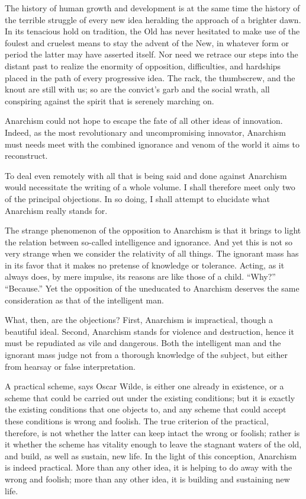 \noindent The history of human growth and development is at the same
time the history of the terrible struggle of every new idea heralding
the approach of a brighter dawn. In its tenacious hold on tradition,
the Old  has never hesitated to make use of the foulest and
cruelest means to stay the advent of the New, in whatever form or
period the latter may have asserted itself. Nor need we retrace our
steps into the distant past to realize the enormity of opposition,
difficulties, and hardships placed in the path of every progressive
idea. The rack, the thumbscrew, and the knout are still with us; so
are the convict's garb and the social wrath, all conspiring against
the spirit that is serenely marching on.

Anarchism could not hope to escape the fate of all other ideas of
innovation. Indeed, as the most revolutionary and uncompromising
innovator, Anarchism must needs meet with the combined ignorance and
venom of the world it aims to reconstruct.

To deal even remotely with all that is being said and done against
Anarchism would necessitate the writing of a whole volume. I shall
therefore meet only two of the principal objections. In so doing, I
shall attempt to elucidate what Anarchism really stands for.

The strange phenomenon of the opposition to Anarchism is that it
brings to light the relation between so-called intelligence and
ignorance. And yet this is not so very strange when we consider the
relativity of all things. The ignorant mass has in its favor that it
makes no pretense of knowledge or tolerance. Acting, as it always
does, by mere impulse, its reasons are like those of a child. ``Why?''
``Because.'' Yet the opposition of the uneducated to Anarchism
deserves the same consideration as that of the intelligent man.

What, then, are the objections? First, Anarchism is
impractical, though a beautiful ideal. Second, Anarchism stands for
violence and destruction, hence it must be repudiated as vile and
dangerous. Both the intelligent man and the ignorant mass judge not
from a thorough knowledge of the subject, but either from hearsay or
false interpretation.

A practical scheme, says Oscar Wilde, is either one already in
existence, or a scheme that could be carried out under the existing
conditions; but it is exactly the existing conditions that one objects
to, and any scheme that could accept these conditions is wrong and
foolish. The true criterion of the practical, therefore, is not
whether the latter can keep intact the wrong or foolish; rather is it
whether the scheme has vitality enough to leave the stagnant waters of
the old, and build, as well as sustain, new life. In the light of this
conception, Anarchism is indeed practical. More than any other idea,
it is helping to do away with the wrong and foolish; more than any
other idea, it is building and sustaining new life.

